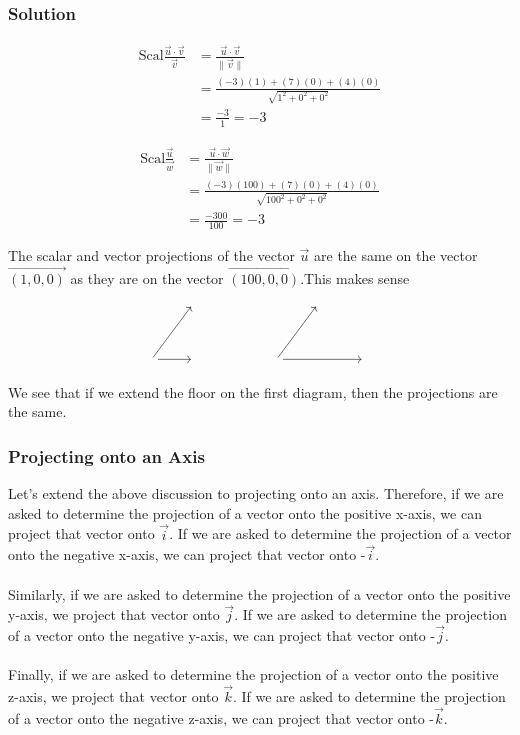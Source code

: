 \documentclass{article}
\begin{document}
\subsubsection*{Solution}
\begin{minipage}{0.45\textwidth}
\begin{align*}
    \text{Scal} \frac{\vec{u}\cdot\vec{v}}{\vec{v}} &= \frac{\vec{u} \cdot \vec{v}}{\|\vec{v}\|} \\
    &= \frac{(-3)(1) + (7)(0) + (4)(0)}{\sqrt{1^2 + 0^2 + 0^2}} \\
    &= \frac{-3}{1} = -3 
\end{align*}
\end{minipage}
\begin{minipage}{0.45\textwidth}
\begin{align*}
    \text{Scal}\frac{\vec{u}}{\vec{w}}&= \frac{\vec{u} \cdot \vec{w}}{\|\vec{w}\|} \\
    &= \frac{(-3)(100) + (7)(0) + (4)(0)}{\sqrt{100^2 + 0^2 + 0^2}} \\
    &= \frac{-300}{100} = -3 
\end{align*}
\end{minipage}
The scalar and vector projections of the vector $\vec{u}$ are the same on the vector $\overrightarrow{(1,0,0)}$ as they are on the vector $\overrightarrow{(100,0,0)}$.This makes sense\\
\[\begin{tikzcd}
	& {} &&& {} \\
	\\
	{} & {} && {} && {}
	\arrow[from=3-1, to=1-2]
	\arrow[from=3-1, to=3-2]
	\arrow[from=3-4, to=1-5]
	\arrow[from=3-4, to=3-6]
\end{tikzcd}\]

We see that if we extend the floor on the first diagram, then the projections are the same.\\

\subsubsection{Projecting onto an Axis}

Let’s extend the above discussion to projecting onto an axis. Therefore, if we are asked to determine the projection of a vector onto the positive x-axis, we can project that vector onto  $\vec{i}$. If we are asked to determine the projection of a vector onto the negative x-axis, we can project that vector onto  -$\vec{i}$.\\\\
Similarly, if we are asked to determine the projection of a vector onto the positive y-axis, we project that vector onto  $\vec{j}$. If we are asked to determine the projection of a vector onto the negative y-axis, we can project that vector onto  -$\vec{j}$.\\\\
Finally, if we are asked to determine the projection of a vector onto the positive z-axis, we project that vector onto  $\vec{k}$. If we are asked to determine the projection of a vector onto the negative z-axis, we can project that vector onto  -$\vec{k}$.
\newpage 
\end{document}
